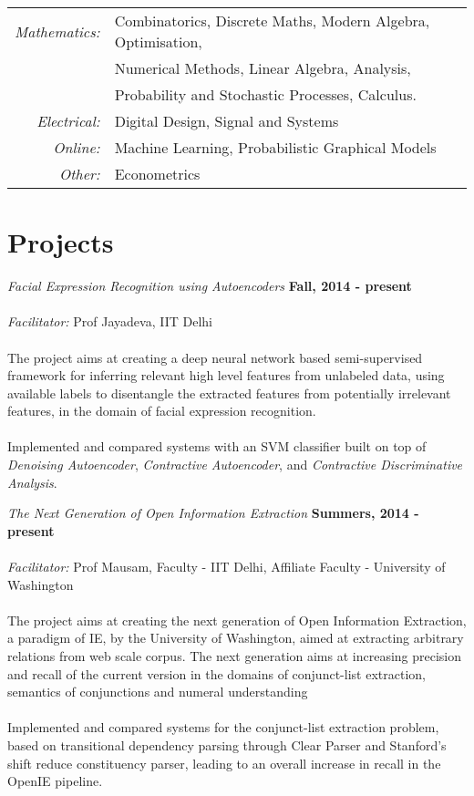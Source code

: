 \documentclass[margin,line]{res}
\begin{document}
\begin{resume}
\begin{tabular}{rlp{5cm}}
\em{Mathematics:} & Combinatorics, Discrete Maths, Modern Algebra, Optimisation,
\\&  Numerical Methods, Linear Algebra, Analysis, 
\\ & Probability and Stochastic Processes, Calculus.\\

\em{Electrical:} & Digital Design, Signal and Systems\\

\em{Online:} & Machine Learning, Probabilistic Graphical Models\\

\em{Other:} &Econometrics\\
\end{tabular}

\section{\sc Projects}

{\em Facial Expression Recognition using Autoencoders} \hfill {\bf Fall, 2014  - present}\\\\
{\em Facilitator:} Prof Jayadeva, IIT Delhi \\\\
The project aims at creating a deep neural network based semi-supervised framework for inferring relevant high level features from unlabeled data, using available labels to disentangle the extracted features from potentially irrelevant features, in the domain of facial expression recognition.\\\\
Implemented and compared systems with an SVM classifier built on top of {\em Denoising Autoencoder}, {\em Contractive Autoencoder}, and {\em Contractive Discriminative Analysis}.

{\em The Next Generation of Open Information Extraction} \hfill {\bf Summers, 2014  - present}\\\\
{\em Facilitator:} Prof Mausam, Faculty - IIT Delhi, Affiliate Faculty - University of Washington \\\\
The project aims at creating the next generation of Open Information Extraction, a paradigm of IE, by the University of Washington, aimed at extracting arbitrary relations from web scale corpus. The next generation aims at increasing precision and recall of the current version in the domains of conjunct-list extraction, semantics of conjunctions and numeral understanding \\\\
Implemented and compared systems  for the conjunct-list extraction problem, based on transitional dependency parsing through Clear Parser and Stanford's shift reduce constituency parser, leading to an overall increase in recall in the OpenIE pipeline.\\


\end{resume}
\end{document}
